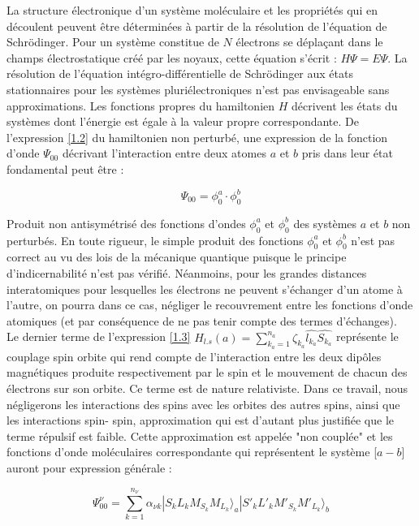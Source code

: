 La structure électronique d'un système moléculaire et les propriétés qui en découlent peuvent être déterminées à partir de la résolution de l'équation de Schr\"{o}dinger. Pour un système constitue de $N$ électrons se déplaçant dans le champs électrostatique créé par les noyaux, cette équation s'écrit : $H\Psi = E\Psi$. La résolution de l'équation intégro-différentielle de Schr\"{o}dinger aux états stationnaires pour les systèmes pluriélectroniques n'est pas envisageable sans approximations. Les fonctions propres du hamiltonien $H$ décrivent les états du systèmes dont l'énergie est égale à la valeur propre correspondante. De l'expression \ref{1.2} du hamiltonien non perturbé, une expression de la fonction d'onde $\Psi_{00}$ décrivant l'interaction entre deux atomes $a$ et $b$ pris dans leur état fondamental peut être : 
	
\begin{equation}
\Psi_{00} = \phi_{0}^{a} \cdot \phi_{0}^{b}
\end{equation}
	
Produit non antisymétrisé des fonctions d'ondes $\phi_{0}^{a}$ et $\phi_{0}^{b}$ des systèmes $a$ et $b$ non perturbés. En toute rigueur, le simple produit des fonctions $\phi_{0}^{a}$ et $\phi_{0}^{b}$ n'est pas correct au vu des lois de la mécanique quantique puisque le principe d'indicernabilité n'est pas vérifié. Néanmoins, pour les grandes distances interatomiques pour lesquelles les électrons ne peuvent s'échanger d'un atome à l'autre, on pourra dans ce cas, négliger le recouvrement entre les fonctions d'onde atomiques (et par conséquence de ne pas tenir compte des termes d'échanges).\\
	
Le dernier terme de l'expression \ref{1.3} $H_{l.s}(a) = \sum_{k_{a}=1}^{n_{a}} \zeta_{k_{a}} \widehat{l_{k_{a}}} \widehat{S_{k_{a}}}$ représente le couplage spin orbite qui rend compte de l'interaction entre les deux dipôles magnétiques produite respectivement par le spin et le mouvement de chacun des électrons sur son orbite. Ce terme est de nature relativiste. Dans ce travail, nous négligerons les interactions des spins avec les orbites des autres spins, ainsi que les interactions spin- spin, approximation qui est d'autant plus justifiée que le terme répulsif est faible. Cette approximation est appelée "non couplée" \cite{fontana1961theory,fontana1962theory} et les fonctions d'onde moléculaires correspondante qui représentent le système [$a-b$] auront pour expression générale : 
	
\begin{equation}
\Psi_{00}^{\nu} = \sum_{k=1}^{n_{\nu}} \alpha_{\nu k}| S_{k} L_{k} M_{S_{k}} M_{L_{k}} \rangle _{a} | S'_{k} L'_{k} M'_{S_{k}} M'_{L_{k}} \rangle _{b}
\end{equation}
	
